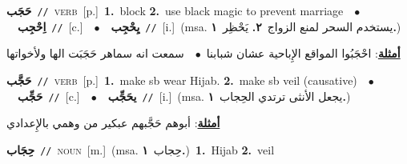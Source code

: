 \documentclass[10pt,a4paper,twoside]{article} %
\begin{document}
\begin{multicols}{2}
{\setlength\topsep{0pt}\textbf{\foreignlanguage{arabic}{حَجَب}}\ {\color{gray}\texttt{//}\color{black}}\ \textsc{verb}\ [p.]\ \textbf{1.}~block  \textbf{2.}~use black magic to prevent marriage\ \ $\bullet$\ \ \setlength\topsep{0pt}\textbf{\foreignlanguage{arabic}{اِحْجِب}}\ {\color{gray}\texttt{//}\color{black}}\ [c.]\ \ $\bullet$\ \ \setlength\topsep{0pt}\textbf{\foreignlanguage{arabic}{يِحْجِب}}\ {\color{gray}\texttt{//}\color{black}}\ [i.]\ \color{gray}(msa. \foreignlanguage{arabic}{يستخدم السحر لمنع الزواج}~\foreignlanguage{arabic}{\textbf{٢.}}  \foreignlanguage{arabic}{يَحْظِر}~\foreignlanguage{arabic}{\textbf{١.}})\color{black}\  \begin{flushright}\color{gray}\foreignlanguage{arabic}{\textbf{\underline{\foreignlanguage{arabic}{أمثلة}}}: احْجَبُوا المواقع الإِباحية عشان شبابنا\ $\bullet$\ \  سمعت انه سماهر حَجَبَت الها ولأخواتها}\end{flushright}\color{black}} \vspace{2mm}

{\setlength\topsep{0pt}\textbf{\foreignlanguage{arabic}{حَجَّب}}\ {\color{gray}\texttt{//}\color{black}}\ \textsc{verb}\ [p.]\ \textbf{1.}~make sb wear Hijab.  \textbf{2.}~make sb veil (causative)\ \ $\bullet$\ \ \setlength\topsep{0pt}\textbf{\foreignlanguage{arabic}{حَجِّب}}\ {\color{gray}\texttt{//}\color{black}}\ [c.]\ \ $\bullet$\ \ \setlength\topsep{0pt}\textbf{\foreignlanguage{arabic}{يحَجِّب}}\ {\color{gray}\texttt{//}\color{black}}\ [i.]\ \color{gray}(msa. \foreignlanguage{arabic}{يجعل الأنثى ترتدي الحِجاب}~\foreignlanguage{arabic}{\textbf{١.}})\color{black}\  \begin{flushright}\color{gray}\foreignlanguage{arabic}{\textbf{\underline{\foreignlanguage{arabic}{أمثلة}}}: أبوهم حَجَّبهم عبكير من وهمي بالإِعدادي}\end{flushright}\color{black}} \vspace{2mm}

{\setlength\topsep{0pt}\textbf{\foreignlanguage{arabic}{حِجَاب}}\ {\color{gray}\texttt{//}\color{black}}\ \textsc{noun}\ [m.]\ \color{gray}(msa. \foreignlanguage{arabic}{حِجاب}~\foreignlanguage{arabic}{\textbf{١.}})\color{black}\ \textbf{1.}~Hijab  \textbf{2.}~veil\ } \vspace{2mm}


\end{multicols}
\end{document}
